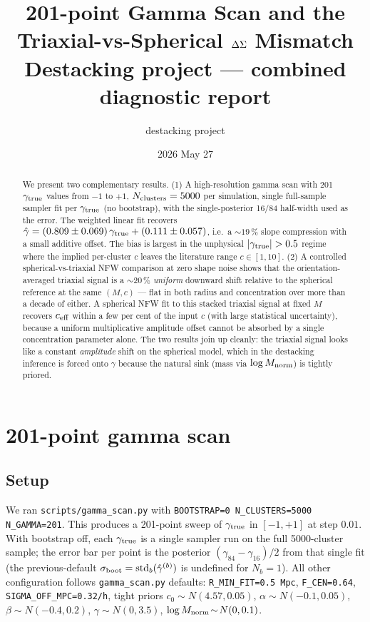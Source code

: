 \documentclass[11pt,a4paper]{article}
\title{\textbf{201-point Gamma Scan and the Triaxial-vs-Spherical
$\Delta\Sigma$ Mismatch}\\[0.4em]
\large Destacking project --- combined diagnostic report}
\author{destacking project}
\date{2026 May 27}
\newcommand{\gtrue}{\gamma_{\rm true}}
\newcommand{\ghat}{\hat\gamma}
\newcommand{\ceff}{c_{\rm eff}}
\begin{document}
\maketitle

\begin{abstract}
We present two complementary results.  (1) A high-resolution gamma scan with
201 $\gtrue$ values from $-1$ to $+1$, $N_{\rm clusters}=5000$ per simulation,
single full-sample sampler fit per $\gtrue$ (no bootstrap), with the
single-posterior 16/84 half-width used as the error.  The weighted linear
fit recovers $\ghat = (0.809 \pm 0.069)\,\gtrue + (0.111 \pm 0.057)$,
i.e.\ a $\sim 19\,\%$ slope compression with a small additive offset.
The bias is largest in the unphysical $|\gtrue| > 0.5$ regime where the
implied per-cluster $c$ leaves the literature range $c\in[1,10]$.  (2) A
controlled spherical-vs-triaxial NFW comparison at zero shape noise shows
that the orientation-averaged triaxial signal is a $\sim 20\,\%$
\emph{uniform} downward shift relative to the spherical reference at the
same $(M,c)$ --- flat in both radius and concentration over more than a
decade of either.  A spherical NFW fit to this stacked triaxial signal at
fixed $M$ recovers $\ceff$ within a few per cent of the input $c$ (with
large statistical uncertainty), because a uniform multiplicative amplitude
offset cannot be absorbed by a single concentration parameter alone.  The
two results join up cleanly: the triaxial signal looks like a constant
\emph{amplitude} shift on the spherical model, which in the destacking
inference is forced onto $\gamma$ because the natural sink (mass via
$\log M_{\rm norm}$) is tightly priored.
\end{abstract}

\tableofcontents
\newpage

\section{201-point gamma scan}

\subsection{Setup}

We ran \texttt{scripts/gamma\_scan.py} with
\texttt{BOOTSTRAP=0 N\_CLUSTERS=5000 N\_GAMMA=201}.  This produces a 201-point
sweep of $\gtrue$ in $[-1,+1]$ at step $0.01$.  With bootstrap off, each
$\gtrue$ is a single sampler run on the full 5000-cluster sample; the error
bar per point is the posterior $(\gamma_{84}-\gamma_{16})/2$ from that
single fit (the previous-default $\sigma_{\rm boot} = \mathrm{std}_b(\ghat^{(b)})$
is undefined for $N_b=1$).  All other configuration follows
\texttt{gamma\_scan.py} defaults:
\texttt{R\_MIN\_FIT=0.5\,Mpc}, \texttt{F\_CEN=0.64},
\texttt{SIGMA\_OFF\_MPC=0.32/h}, tight priors
$c_0\!\sim\! N(4.57,0.05)$, $\alpha\!\sim\! N(-0.1,0.05)$,
$\beta\!\sim\! N(-0.4,0.2)$, $\gamma\!\sim\! N(0,3.5)$,
$\log M_{\rm norm}\!\sim\! N(0,0.1)$.
\end{document}
